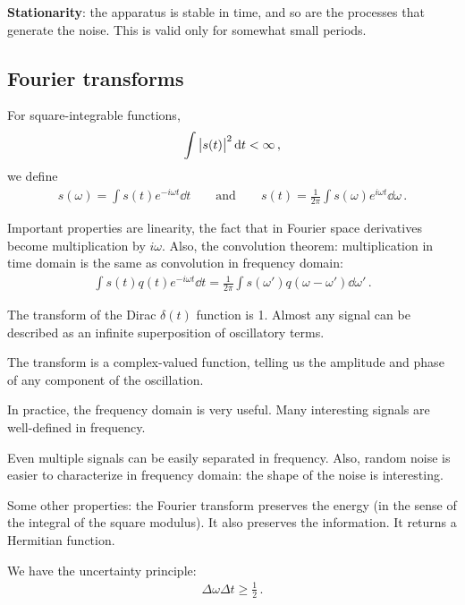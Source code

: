 \documentclass[main.tex]{subfiles}
\begin{document}

\textbf{Stationarity}: the apparatus is stable in time, and so are the processes that generate the noise.
This is valid only for somewhat small periods. 

\subsection{Fourier transforms}

For square-integrable functions, 
%
\begin{align}
\int \abs{s(t)}^2 \dd{t} < \infty 
\,,
\end{align}
%
we define 
%
\begin{align}
s(\omega ) = \int s(t) e^{-i \omega t} \dd{t}
\qquad \text{and} \qquad
s(t) = \frac{1}{2 \pi } \int s(\omega ) e^{i \omega t} \dd{\omega } 
\,.
\end{align}

Important properties are linearity, the fact that in Fourier space derivatives become multiplication by \(i \omega \). 
Also, the convolution theorem: multiplication in time domain is the same as convolution in frequency domain: 
%
\begin{align}
\int s(t) q(t) e^{-i \omega t} \dd{t} = \frac{1}{2 \pi } \int s(\omega') q (\omega - \omega') \dd{\omega'}
\,.
\end{align}

The transform of the Dirac \(\delta(t) \) function is 1.
Almost any signal can be described as an infinite superposition of oscillatory terms. 

The transform is a complex-valued function, telling us the amplitude and phase of any component of the oscillation.

In practice, the frequency domain is very useful. Many interesting signals are well-defined in frequency.

Even multiple signals can be easily separated in frequency. 
Also, random noise is easier to characterize in frequency domain: the shape of the noise is interesting.

Some other properties: the Fourier transform preserves the energy (in the sense of the integral of the square modulus). 
It also preserves the information. It returns a Hermitian function. 

We have the uncertainty principle: 
%
\begin{align}
\Delta \omega \Delta t \geq \frac{1}{2} 
\,.
\end{align}
\end{document}
